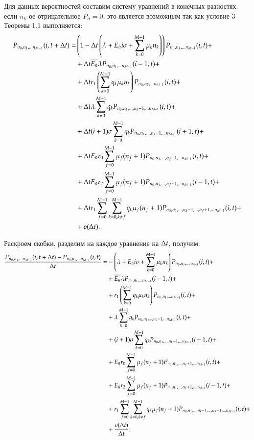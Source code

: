Для данных вероятностей составим систему уравнений в конечных разностях. 
если \(n_k\)-ое отрицательное \(P_{\bar{n}} = 0\),
это является возможным так как условие 3 Теоремы 1.1 выполняется: 
\begin{equation*}\begin{aligned}   
{P}_{{n}_0, {n}_1, ... {n}_{M-1}}(i,t+\Delta t)= 
    &\left( {1-\Delta t\left( {\lambda + E_{\bar{n}} i \sigma+\sum_{{k}=0}^{M-1}\mu_{k}{n}_{k}} \right)} \right)
        {P}_{{n}_0, {n}_1, ... {n}_{M-1}}(i,t)+\\
    &+\Delta t \overline{E_{\bar{n}}} \lambda {P}_{{n}_0, {n}_1, ... {n}_{M-1}}(i-1,t)+\\
    &+\Delta t r_1 \left( {\sum_{{k}=0}^{M-1} q_{k}\mu_{k}{n}_{k}} \right) {P}_{{n}_0, {n}_1, ... {n}_{M-1}}(i,t) + \\
    &+\Delta t \lambda\sum_{k=0}^{M-1}q_k {P}_{{n}_0, {n}_1, ... , {n}_{k} - 1, ... {n}_{M-1}}(i,t) + \\
    &+\Delta t (i+1)\sigma\sum_{k=0}^{M-1}q_k {P}_{{n}_0, {n}_1, ... , {n}_{k} - 1, ... {n}_{M-1}}(i+1,t) + \\
    &+\Delta t E_{\bar{n}} r_0 \sum_{f=0}^{M-1} \mu_f (n_f + 1) {P}_{{n}_0, {n}_1, ... , {n}_{f} + 1, ... {n}_{M-1}}(i,t) + \\
    &+\Delta t E_{\bar{n}} r_2 \sum_{f=0}^{M-1} \mu_f (n_f + 1) {P}_{{n}_0, {n}_1, ... , {n}_{f} + 1, ... {n}_{M-1}}(i-1,t) + \\
    &+\Delta t r_1 \sum_{{f}=0}^{M-1} \sum_{{k}=0, {k} \neq {f}}^{M-1}
        q_k \mu_f (n_f+1) {P}_{{n}_0, {n}_1, ... , {n}_{k} - 1, ... , {n}_{f} + 1, ... {n}_{M-1}}(i,t) + \\
    &+o(\Delta t).
\end{aligned}\end{equation*}

Раскроем скобки, разделим на каждое уравнение на \(\Delta t\), получим:
\begin{equation*}\begin{aligned}
\frac{{P}_{{n}_0, {n}_1, ... {n}_{M-1}}(i,t+\Delta t)-{P}_{{n}_0, {n}_1, ... {n}_{M-1}}(i,t)}{\Delta t}= 
    &-\left( {\lambda + E_{\bar{n}} i \sigma+\sum_{{k}=0}^{M-1}\mu_{k}{n}_{k}} \right){P}_{{n}_0, {n}_1, ... {n}_{M-1}}(i,t)+\\
    &+\overline{E_{\bar{n}}} \lambda {P}_{{n}_0, {n}_1, ... {n}_{M-1}}(i-1,t)+\\
    &+r_1 \left( {\sum_{{k}=0}^{M-1} q_{k}\mu_{k}{n}_{k}} \right) {P}_{{n}_0, {n}_1, ... {n}_{M-1}}(i,t) + \\
    &+\lambda\sum_{k=0}^{M-1}q_k {P}_{{n}_0, {n}_1, ... , {n}_{k} - 1, ... {n}_{M-1}}(i,t) + \\
    &+(i+1)\sigma\sum_{k=0}^{M-1}q_k {P}_{{n}_0, {n}_1, ... , {n}_{k} - 1, ... {n}_{M-1}}(i+1,t) + \\
    &+E_{\bar{n}} r_0 \sum_{f=0}^{M-1} \mu_f (n_f + 1) {P}_{{n}_0, {n}_1, ... , {n}_{f} + 1, ... {n}_{M-1}}(i,t) + \\
    &+E_{\bar{n}} r_2 \sum_{f=0}^{M-1} \mu_f (n_f + 1) {P}_{{n}_0, {n}_1, ... , {n}_{f} + 1, ... {n}_{M-1}}(i-1,t) + \\
    &+r_1 \sum_{{f}=0}^{M-1} \sum_{{k}=0, {k} \neq {f}}^{M-1}
        q_k \mu_f (n_f+1) {P}_{{n}_0, {n}_1, ... , {n}_{k} - 1, ... , {n}_{f} + 1, ... {n}_{M-1}}(i,t) + \\
    &+\frac{o(\Delta t)}{\Delta t}.
\end{aligned}\end{equation*}

